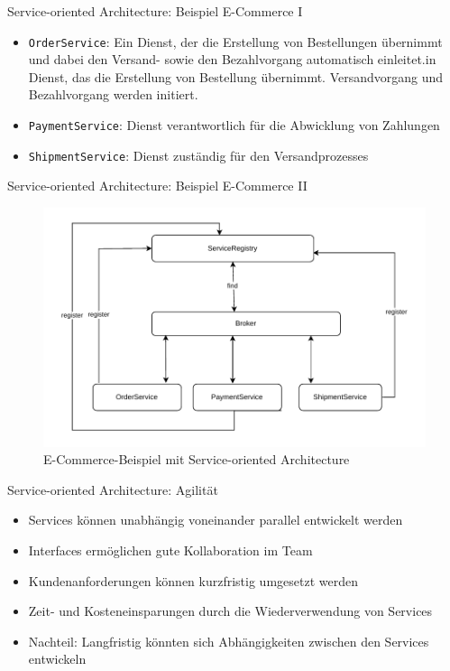 \begin{frame}{Service-oriented Architecture: Beispiel E-Commerce I}
    \begin{itemize}
        \item \texttt{OrderService}: Ein Dienst, der die Erstellung von Bestellungen übernimmt und dabei den Versand- sowie den Bezahlvorgang automatisch einleitet.in Dienst, das die Erstellung von Bestellung übernimmt. Versandvorgang und Bezahlvorgang werden initiert.
        \item \texttt{PaymentService}: Dienst verantwortlich für die Abwicklung von Zahlungen
        \item \texttt{ShipmentService}: Dienst zuständig für den Versandprozesses
    \end{itemize}
\end{frame}

\begin{frame}{Service-oriented Architecture: Beispiel E-Commerce II}
    \begin{figure}[!h]
        \centering
        \includegraphics[scale=0.5]{imglib/soa/soa-example.pdf}
        \caption{E-Commerce-Beispiel mit Service-oriented Architecture}
        \label{fig:soaecommerce}
    \end{figure}
\end{frame}

\begin{frame}{Service-oriented Architecture: Agilität}
    \begin{itemize}
        \item Services können unabhängig voneinander parallel entwickelt werden
        \item Interfaces ermöglichen gute Kollaboration im Team
        \item Kundenanforderungen können kurzfristig umgesetzt werden
        \item Zeit- und Kosteneinsparungen durch die Wiederverwendung von Services
        \item Nachteil: Langfristig könnten sich Abhängigkeiten zwischen den Services entwickeln
      \end{itemize}
\end{frame}
